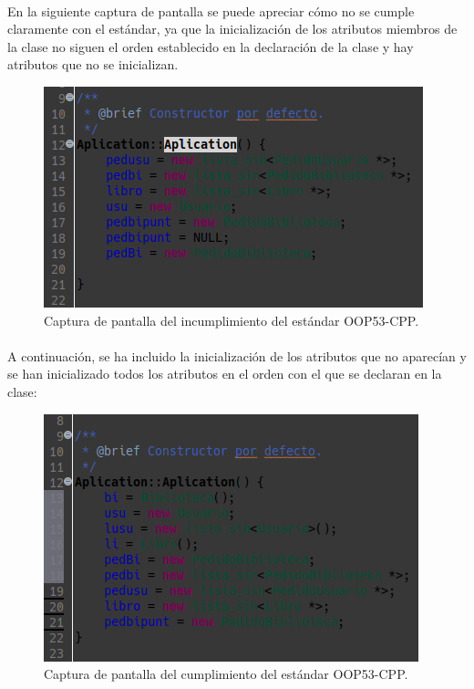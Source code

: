 			\paragraph{}En la siguiente captura de pantalla se puede apreciar cómo no se cumple claramente con el estándar, ya que la inicialización de los atributos miembros de la clase no siguen el orden establecido en la declaración  de la clase y hay atributos que no se inicializan.
			
			\begin{figure}[H]
				\centering
				\includegraphics[scale=0.7]{img/captura3.png}
				\caption{Captura de pantalla del incumplimiento del estándar OOP53-CPP.}
				\label{captura3}
			\end{figure}
		
			\paragraph{} A continuación, se ha incluido la inicialización de los atributos que no aparecían y se han inicializado todos los atributos en el orden con el que se declaran en la clase:
			
			\begin{figure}[H]
				\centering
				\includegraphics[scale=0.7]{img/captura4.png}
				\caption{Captura de pantalla del cumplimiento del estándar OOP53-CPP.}
				\label{captura4}
			\end{figure}
		
